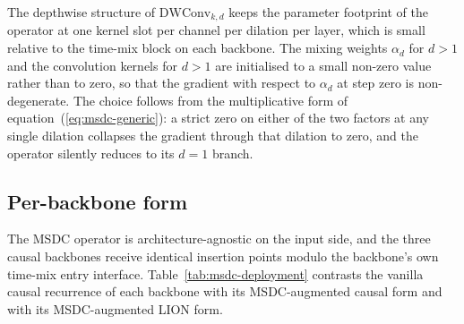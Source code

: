The depthwise structure of $\mathrm{DWConv}_{k, d}$ keeps the
parameter footprint of the operator at one kernel slot per channel
per dilation per layer, which is small relative to the time-mix
block on each backbone. The mixing weights $\alpha_{d}$ for $d > 1$
and the convolution kernels for $d > 1$ are initialised to a small
non-zero value rather than to zero, so that the gradient with respect
to $\alpha_{d}$ at step zero is non-degenerate. The choice follows
from the multiplicative form of equation~(\ref{eq:msdc-generic}): a
strict zero on either of the two factors at any single dilation
collapses the gradient through that dilation to zero, and the
operator silently reduces to its $d = 1$ branch.

\subsection{Per-backbone form}

The MSDC operator is architecture-agnostic on the input side, and
the three causal backbones receive identical insertion points modulo
the backbone's own time-mix entry interface.
Table~\ref{tab:msdc-deployment} contrasts the vanilla causal
recurrence of each backbone with its MSDC-augmented causal form and
with its MSDC-augmented LION form.

